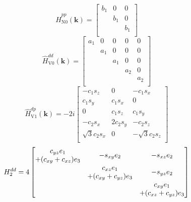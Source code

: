 \documentclass[twocolumn,showpacs,preprintnumbers,superscriptaddress,prb,floatfix,aps,10pt]{revtex4-1}
\renewcommand{\vec}[1]{\ensuremath{\mathbf{#1}}}
\newcommand*{\ham}{\hat{H}}
\begin{document}
\begin{widetext}
\begin{equation}
\label{eq:0pp}
\ham_{\textrm{N0}}^{pp}(\vec{k})=
\begin{bmatrix}
b_{1} & 0     & 0\\
      & b_{1} & 0\\
      &       & b_{1}\\
\end{bmatrix}
\end{equation}
%
\begin{equation}
\label{eq:0dd}
\ham_{\textrm{V0}}^{dd}(\vec{k})=
\begin{bmatrix}
a_{1} & 0     & 0     & 0     & 0\\
      & a_{1} & 0     & 0     & 0\\
      &       & a_{1} & 0     & 0\\
      &       &       & a_{2} & 0\\
      &       &       &       & a_{2}\\
\end{bmatrix}
\end{equation}
%
\begin{equation}
\ham_{\textrm{V1}}^{dp}(\vec{k})=-2i
\begin{bmatrix}
-c_{1}s_{z}        & 0           & -c_{1}s_{x}\\
c_{1}s_{y}         & c_{1}s_{x}  & 0\\
0                  & c_{1}s_{z}  & c_{1}s_{y}\\
-c_{2}s_{x}        & 2c_{2}s_{y} & -c_{2}s_{z}\\
\sqrt{3}c_{2}s_{x} & 0           & -\sqrt{3}c_{2}s_{z}\\
\end{bmatrix}
\end{equation}
%
\begin{equation}
H_2^{dd}=4
\begin{bmatrix}
c_{yz}e_{1}           & \multirow{2}{*}{$-s_{xy}e_{2}$} & \multirow{2}{*}{$-s_{xz}e_{2}$}\\
+(c_{xy}+c_{xz})e_{3} &                                 & \\
\multirow{2}{*}{ }    & c_{xz}e_{1}                     & \multirow{2}{*}{$-s_{yz}e_{2}$}\\
                      & +(c_{xy}+c_{yz})e_{3}           & \\
\multirow{2}{*}{ }    & \multirow{2}{*}{ }              & c_{xy}e_{1} \\
                      &                                 & +(c_{xz}+c_{yz})e_{3}\\

\end{bmatrix}
\end{equation}
\end{widetext}
\end{document}
